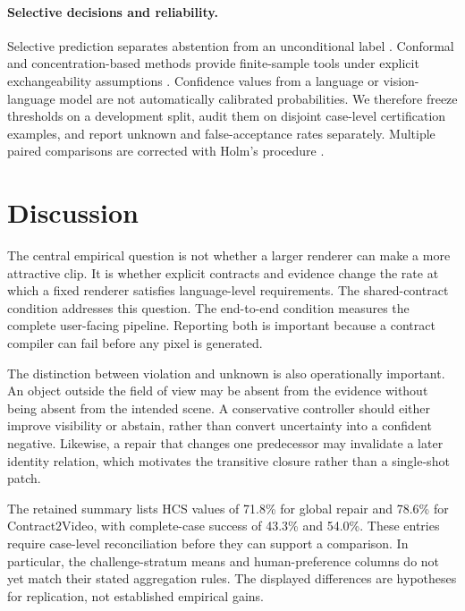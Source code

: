 \documentclass[11pt]{article}
\begin{document}
\paragraph{Selective decisions and reliability.}
Selective prediction separates abstention from an unconditional label
\citep{geifman2017selective}. Conformal and concentration-based methods provide
finite-sample tools under explicit exchangeability assumptions
\citep{angelopoulos2023conformal,hoeffding1963probability}. Confidence values
from a language or vision-language model are not automatically calibrated
probabilities. We therefore freeze thresholds on a development split, audit
them on disjoint case-level certification examples, and report unknown and
false-acceptance rates separately. Multiple paired comparisons are corrected
with Holm's procedure \citep{holm1979simple}.





\section{Discussion}
\label{sec:discussion}

The central empirical question is not whether a larger renderer can make a
more attractive clip. It is whether explicit contracts and evidence change the
rate at which a fixed renderer satisfies language-level requirements. The
shared-contract condition addresses this question. The end-to-end
condition measures the complete user-facing pipeline. Reporting both is
important because a contract compiler can fail before any pixel is generated.

The distinction between violation and unknown is also operationally important.
An object outside the field of view may be absent from the evidence without
being absent from the intended scene. A conservative controller should either
improve visibility or abstain, rather than convert uncertainty into a confident
negative. Likewise, a repair that changes one predecessor may invalidate a
later identity relation, which motivates the transitive closure rather than a
single-shot patch.

The retained summary lists HCS values of 71.8\% for global repair and
78.6\% for Contract2Video, with complete-case success of 43.3\% and 54.0\%.
These entries require case-level reconciliation before they can support a
comparison. In particular, the challenge-stratum means and human-preference
columns do not yet match their stated aggregation rules. The displayed
differences are hypotheses for replication, not established empirical gains.
\end{document}
